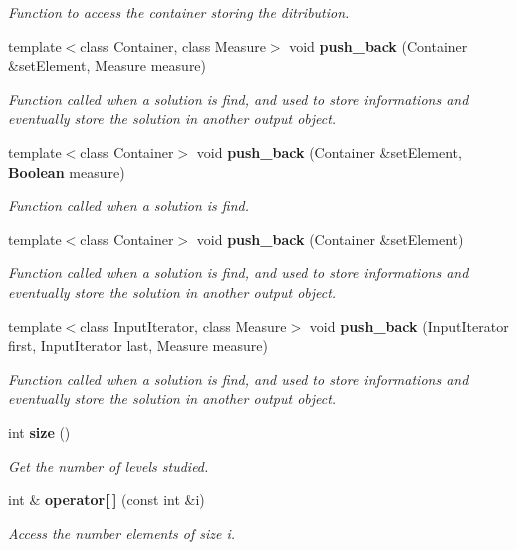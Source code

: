 \begin{CompactItemize}
\begin{CompactList}\small\item\em Function to access the container storing the ditribution. \item\end{CompactList}\item 
template$<$class Container, class Measure$>$ void {\bf push\_\-back} (Container \&set\-Element, Measure measure)
\begin{CompactList}\small\item\em Function called when a solution is find, and used to store informations and eventually store the solution in another output object. \item\end{CompactList}\item 
template$<$class Container$>$ void {\bf push\_\-back} (Container \&set\-Element, {\bf Boolean} measure)
\begin{CompactList}\small\item\em Function called when a solution is find. \item\end{CompactList}\item 
template$<$class Container$>$ void {\bf push\_\-back} (Container \&set\-Element)
\begin{CompactList}\small\item\em Function called when a solution is find, and used to store informations and eventually store the solution in another output object. \item\end{CompactList}\item 
template$<$class Input\-Iterator, class Measure$>$ void {\bf push\_\-back} (Input\-Iterator first, Input\-Iterator last, Measure measure)
\begin{CompactList}\small\item\em Function called when a solution is find, and used to store informations and eventually store the solution in another output object. \item\end{CompactList}\item 
int {\bf size} ()\label{class_record_distribution_df406703f289b76e764dbb11f17442e7}

\begin{CompactList}\small\item\em Get the number of levels studied. \item\end{CompactList}\item 
int \& {\bf operator[$\,$]} (const int \&i)\label{class_record_distribution_a6a9e7b9f8bae800c8c1fdd12b402b91}

\begin{CompactList}\small\item\em Access the number elements of size i. \item\end{CompactList}\end{CompactItemize}
